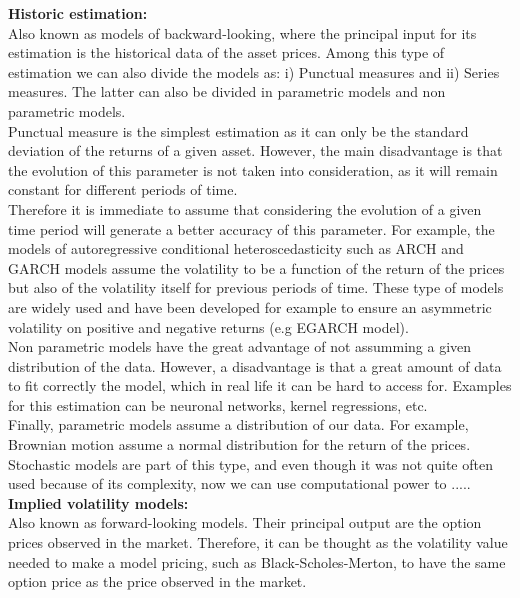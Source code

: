 \documentclass[12pt]{article}
\begin{document}
\textbf{Historic estimation:} 
\\

Also known as models of backward-looking, where the principal input for its estimation is the historical data of the asset prices. Among this type of estimation we can also divide the models as: i) Punctual measures and ii) Series measures. The latter can also be divided in parametric models and non parametric models.
 \\
 
Punctual measure is the simplest estimation as it can only be the standard deviation of the returns of a given asset. However, the main disadvantage is that the evolution of this parameter is not taken into consideration, as it will remain constant for different periods of time. 
\\

Therefore it is immediate to assume that considering the evolution of a given time period will generate a better accuracy of this parameter. For example, the models of autoregressive conditional heteroscedasticity such as ARCH and GARCH models assume the volatility to be a function of the return of the prices but also of the volatility itself for previous periods of time. These type of models are widely used and have been developed for example to ensure an asymmetric volatility on positive and negative returns (e.g EGARCH model).
\\

Non parametric models have the great advantage of not assumming a given distribution of the data. However, a disadvantage is that a great amount of data to fit correctly the model, which in real life it can be hard to access for. Examples for this estimation can be neuronal networks, kernel regressions, etc.
\\

Finally, parametric models assume a distribution of our data. For example, Brownian motion assume a normal distribution for the return of the prices. Stochastic models are part of this type, and even though it was not quite often used because of its complexity, now we can use computational power to .....
\\

\textbf{Implied volatility models:}
\\

Also known as forward-looking models. Their principal output are the option prices observed in the market. Therefore, it can be thought as the volatility value needed to make a model pricing, such as Black-Scholes-Merton, to have the same option price as the price observed in the market.
\end{document}
